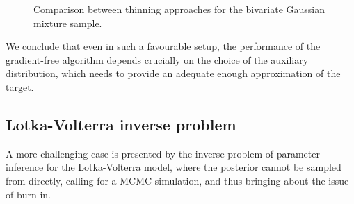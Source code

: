 \documentclass[11pt,a4paper]{report}
\begin{document}
\begin{figure}[h]
\centering
{}
\caption{Comparison between thinning approaches for the bivariate Gaussian mixture sample.
\label{fig:gmm:comparison}}
\end{figure}

We conclude that even in such a favourable setup, the performance of the gradient-free algorithm depends crucially on the choice of the auxiliary distribution, which needs to provide an adequate enough approximation of the target.

\subsection{Lotka-Volterra inverse problem}
\label{sec:lotka-volterra}

A more challenging case is presented by the inverse problem of parameter inference for the Lotka-Volterra model, where the posterior cannot be sampled from directly, calling for a MCMC simulation, and thus bringing about the issue of burn-in.
\end{document}
